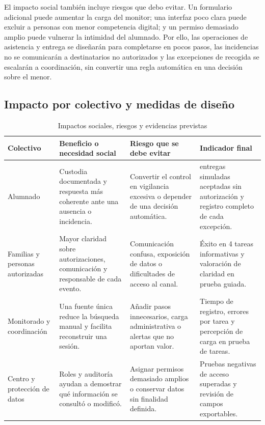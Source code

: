 El impacto social también incluye riesgos que debo evitar. Un formulario adicional puede aumentar la carga del monitor; una interfaz poco clara puede excluir a personas con menor competencia digital; y un permiso demasiado amplio puede vulnerar la intimidad del alumnado. Por ello, las operaciones de asistencia y entrega se diseñarán para completarse en pocos pasos, las incidencias no se comunicarán a destinatarios no autorizados y las excepciones de recogida se escalarán a coordinación, sin convertir una regla automática en una decisión sobre el menor.

\subsection{Impacto por colectivo y medidas de diseño}\label{sec:sost-5-1}

\begin{table}[H]
\centering\small
\begin{tabularx}{\textwidth}{>{\hsize=0.747\hsize\raggedright\arraybackslash}X>{\hsize=1.095\hsize\raggedright\arraybackslash}X>{\hsize=1.095\hsize\raggedright\arraybackslash}X>{\hsize=1.063\hsize\raggedright\arraybackslash}X}
\toprule
\rowcolor{cabeceratabla} \textbf{Colectivo} & \textbf{Beneficio o necesidad social} & \textbf{Riesgo que se debe evitar} & \textbf{Indicador final} \\
\midrule
Alumnado & Custodia documentada y respuesta más coherente ante una ausencia o incidencia. & Convertir el control en vigilancia excesiva o depender de una decisión automática. & 0 entregas simuladas aceptadas sin autorización y registro completo de cada excepción. \\
Familias y personas autorizadas & Mayor claridad sobre autorizaciones, comunicación y responsable de cada evento. & Comunicación confusa, exposición de datos o dificultades de acceso al canal. & Éxito en 4 tareas informativas y valoración de claridad en prueba guiada. \\
Monitorado y coordinación & Una fuente única reduce la búsqueda manual y facilita reconstruir una sesión. & Añadir pasos innecesarios, carga administrativa o alertas que no aportan valor. & Tiempo de registro, errores por tarea y percepción de carga en prueba de tareas. \\
Centro y protección de datos & Roles y auditoría ayudan a demostrar qué información se consultó o modificó. & Asignar permisos demasiado amplios o conservar datos sin finalidad definida. & Pruebas negativas de acceso superadas y revisión de campos exportables. \\
\bottomrule
\end{tabularx}
\caption{Impactos sociales, riesgos y evidencias previstas}\label{tab:40}
\end{table}

